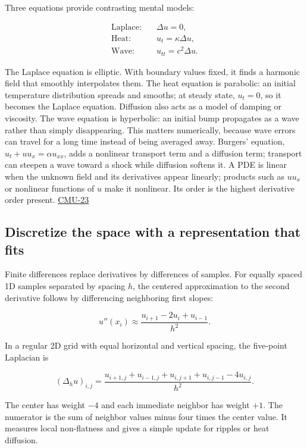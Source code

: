 Three equations provide contrasting mental models:

\[
\begin{aligned}
\text{Laplace:}\quad &\Delta u=0,\\
\text{Heat:}\quad &u_t=\kappa\Delta u,\\
\text{Wave:}\quad &u_{tt}=c^2\Delta u.
\end{aligned}
\]

The Laplace equation is elliptic. With boundary values fixed, it finds a harmonic field that smoothly interpolates them. The heat equation is parabolic: an initial temperature distribution spreads and smooths; at steady state, \(u_t=0\), so it becomes the Laplace equation. Diffusion also acts as a model of damping or viscosity. The wave equation is hyperbolic: an initial bump propagates as a wave rather than simply disappearing. This matters numerically, because wave errors can travel for a long time instead of being averaged away. Burgers' equation, \(u_t+u u_x=\alpha u_{xx}\), adds a nonlinear transport term and a diffusion term; transport can steepen a wave toward a shock while diffusion softens it. A PDE is linear when the unknown field and its derivatives appear linearly; products such as \(u u_x\) or nonlinear functions of \(u\) make it nonlinear. Its order is the highest derivative order present. \hyperref[04-visual-computing-ii-ch036-cmu-23---physically-based-animation-and-pdes]{CMU-23}

\subsection{Discretize the space with a representation that fits}\label{04-visual-computing-ii-ch030-discretize-the-space-with-a-representation-that-fits}

Finite differences replace derivatives by differences of samples. For equally spaced 1D samples separated by spacing \(h\), the centered approximation to the second derivative follows by differencing neighboring first slopes:

\[
u''(x_i)\approx\frac{u_{i+1}-2u_i+u_{i-1}}{h^2}.
\]

In a regular 2D grid with equal horizontal and vertical spacing, the five-point Laplacian is

\[
(\Delta_h u)_{i,j}=\frac{u_{i+1,j}+u_{i-1,j}+u_{i,j+1}+u_{i,j-1}-4u_{i,j}}{h^2}.
\]

The center has weight \(-4\) and each immediate neighbor has weight \(+1\). The numerator is the sum of neighbor values minus four times the center value. It measures local non-flatness and gives a simple update for ripples or heat diffusion.

